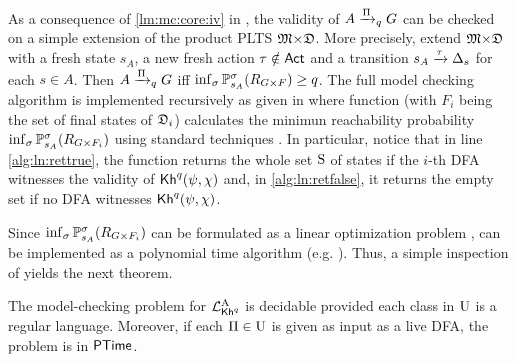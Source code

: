 As a consequence of \cref{lm:mc:core:iv} in , the
validity of $A\reach{\plans}_qG$ can be checked
on a simple extension of the product PLTS
$\model{\times}\dfa$.  More precisely, extend $\model{\times}\dfa$
with a fresh state $s_A$, a new fresh action $\tau\notin\Act$ and a
transition $s_A\reach{\tau}\Dirac_{s}$ for each $s\in A$.  Then
$A\reach{\plans}_qG$ iff
$\inf_{\strat}\Prob^{\strat}_{s_A}(R_{G{\times}F})\geq q$.
%
The full model checking algorithm is implemented recursively as given
in  where function 
(with $F_i$ being the set of final states of $\dfa_i$) calculates the
minimun reachability probability
$\inf_{\strat}\Prob^{\strat}_{s_A}(R_{G{\times}F_i})$ using standard
techniques \cite{Puterman94,BaierK08}.
%
In particular, notice that in line \ref{alg:ln:rettrue}, the function
returns the whole set $\S$ of states if the $i$-th DFA witnesses the
validity of $\kh^q(\psi,\chi)$ and, in \ref{alg:ln:retfalse}, it
returns the empty set if no DFA witnesses $\kh^q(\psi,\chi)$.
%

Since $\inf_{\strat}\Prob^{\strat}_{s_A}(R_{G{\times}F_i})$ can be
formulated as a linear optimization problem
\cite{Puterman94,BA95,BaierK08},  can be implemented as
a polynomial time algorithm (e.g. \cite{Karmarkar84}).  Thus, a simple
inspection of  yields the next theorem.

\begin{theorem}\label{th:PKhadapt:mc}
  The model-checking problem for $\PKhadapt$ is decidable provided
  each class in $\Unc$ is a regular language. Moreover, if each
  $\plans\in\Unc$ is given as input as a live DFA, the problem is in
  $\PTIME$.
\end{theorem}







